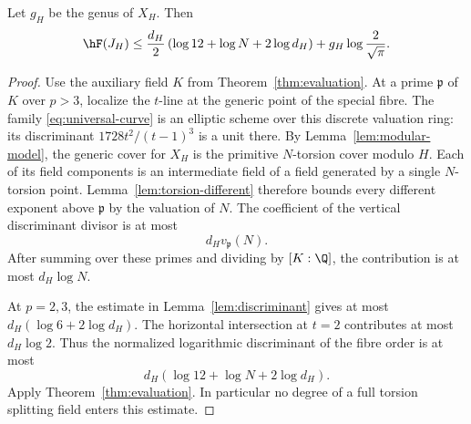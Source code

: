 \begin{corollary}\label{cor:modularheight}
Let $g_H$ be the genus of $X_H$. Then
\begin{equation}\label{eq:modularheight}
 \hF(J_H)\le
 \frac{d_H}{2}\left(\log12+\log N+2\log d_H\right)
                  +g_H\log\frac2{\sqrt\pi}.
\end{equation}
\end{corollary}
\begin{proof}
Use the auxiliary field $K$ from Theorem~\ref{thm:evaluation}.
At a prime $\mathfrak p$ of $K$ over $p>3$, localize the $t$-line
at the generic point of the special fibre. The family
\eqref{eq:universal-curve} is an elliptic scheme over this discrete
valuation ring: its discriminant $1728t^2/(t-1)^3$ is a unit there.
By Lemma~\ref{lem:modular-model}, the generic cover for $X_H$ is
the primitive $N$-torsion cover modulo $H$. Each of its field
components is an intermediate field of a field generated by a single
$N$-torsion point. Lemma~\ref{lem:torsion-different} therefore bounds
every different exponent above $\mathfrak p$ by the valuation of $N$.
The coefficient of the vertical discriminant divisor is at most
\[
                    d_H v_{\mathfrak p}(N).
\]
After summing over these primes and dividing by $[K:\Q]$, the
contribution is at most $d_H\log N$.

At $p=2,3$, the estimate in Lemma~\ref{lem:discriminant} gives at
most $d_H(\log6+2\log d_H)$. The horizontal intersection at
$t=2$ contributes at most $d_H\log2$. Thus the normalized
logarithmic discriminant of the fibre order is at most
\[
                 d_H(\log12+\log N+2\log d_H).
\]
Apply Theorem~\ref{thm:evaluation}. In particular no degree of a
full torsion splitting field enters this estimate.
\end{proof}
